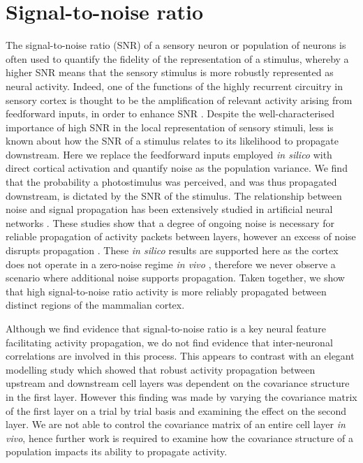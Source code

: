 \section{Signal-to-noise ratio}
The signal-to-noise ratio (SNR) of a sensory neuron \cite{barlow_three_1969} or population of neurons \cite{zohary_correlated_1994} is often used to quantify the fidelity of the representation of a stimulus, whereby a higher SNR means that the sensory stimulus is more robustly represented as neural activity. Indeed, one of the functions of the highly recurrent circuitry in sensory cortex is thought to be the amplification of relevant activity arising from feedforward inputs, in order to enhance SNR \cite{douglas_recurrent_1995-1, ganguli_one-dimensional_2008}. Despite the well-characterised importance of high SNR in the local representation of sensory stimuli, less is known about how the SNR of a stimulus relates to its likelihood to propagate downstream. Here we replace the feedforward inputs employed \textit{in silico} with direct cortical activation and quantify noise as the population variance. We find that the probability a photostimulus was perceived, and was thus propagated downstream, is dictated by the SNR of the stimulus. The relationship between noise and signal propagation has been extensively studied in artificial neural networks \cite{vogels_signal_2005, diesmann_stable_1999, ozer_weak_2010, guo_signal_2011}. These studies show that a degree of ongoing noise is necessary for reliable propagation of activity packets between layers, however an excess of noise disrupts propagation \cite{guo_signal_2011}. These \textit{in silico} results are supported here as the cortex does not operate in a zero-noise regime \textit{in vivo} \cite{vreeswijk_chaotic_1998-1, faisal_noise_2008-1, anderson_contribution_2000, burns_spontaneous_1976, london_sensitivity_2010}, therefore we never observe a scenario where additional noise supports propagation. Taken together, we show that high signal-to-noise ratio activity is more reliably propagated between distinct regions of the mammalian cortex.

Although we find evidence that signal-to-noise ratio is a key neural feature facilitating activity propagation, we do not find evidence that inter-neuronal correlations are involved in this process. This appears to contrast with an elegant modelling study \cite{zylberberg_robust_2017} which showed that robust activity propagation between upstream and downstream cell layers was dependent on the covariance structure in the first layer. However this finding was made by varying the covariance matrix of the first layer on a trial by trial basis and examining the effect on the second layer. We are not able to control the covariance matrix of an entire cell layer \textit{in vivo}, hence further work is required to examine how the covariance structure of a population impacts its ability to propagate activity. 

